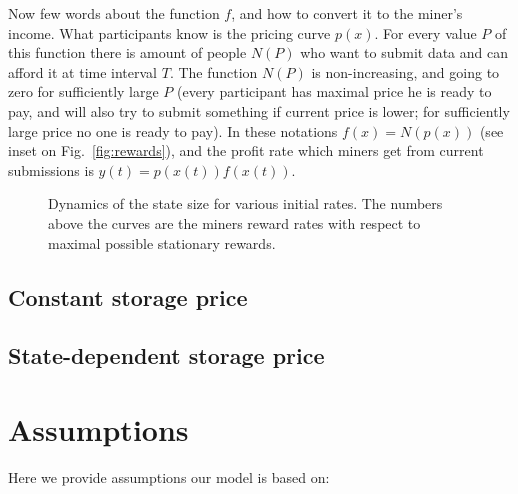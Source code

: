 \documentclass[]{llncs}   %
\newcommand{\authnote}[2]{\marginpar{\parbox{\marginparwidth}{\tiny %
  \textsf{#1 {\textcolor{blue}{notes: #2}}}}}%
  \textcolor{blue}{\textbf{\dag}}}
\newcommand{\authnote}[2]{
  \textsf{#1\textcolor{blue}{ #2}}}
\newcommand{\authnote}[2]{}
\newcommand{\knote}[1]{{\authnote{\textcolor{green}{Alex notes:}}{#1}}}
\begin{document}
Now few words about the function $f$, and how to convert it to the miner's
income. What participants know is the pricing curve $p(x)$. For every value $P$
of this function there is amount of people $N(P)$ who want to submit data and
can afford it at time interval $T$. The function $N(P)$ is non-increasing, and
going to zero for sufficiently large $P$ (every participant has maximal price he
is ready to pay, and will also try to submit something if current price is
lower; for sufficiently large price no one is ready to pay). In these notations
$f(x)=N(p(x))$ (see inset on Fig.~\ref{fig:rewards}), and the profit rate which
miners get from current submissions is $y(t) = p(x(t))f(x(t))$.
\begin{figure}
    
    \caption{
        \label{fig:dynamics} Dynamics of the state size for various initial
        rates. The numbers above the curves are the miners reward rates with
        respect to maximal possible stationary rewards.
    }
\end{figure}

\subsection{Constant storage price}
\subsection{State-dependent storage price}


\knote{to remove totally?}

\section{Assumptions}
Here we provide assumptions our model is based on:
\end{document}
